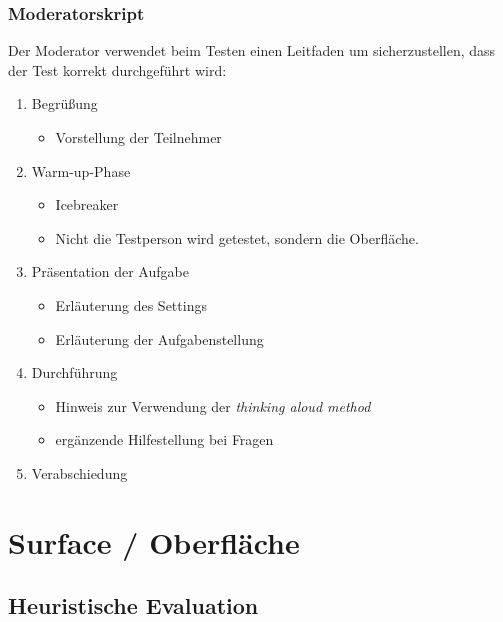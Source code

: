 \documentclass{article}
\begin{document}
\subsubsection{Moderatorskript}

Der Moderator verwendet beim Testen einen Leitfaden um sicherzustellen, dass der Test korrekt durchgeführt wird:
\begin{enumerate}
\item Begrüßung
	\begin{itemize}
	\item Vorstellung der Teilnehmer
	\end{itemize}
\item Warm-up-Phase
	\begin{itemize}
	\item Icebreaker
	\item Nicht die Testperson wird getestet, sondern die Oberfläche.
	\end{itemize}
\item Präsentation der Aufgabe
	\begin{itemize}
	\item Erläuterung des Settings
	\item Erläuterung der Aufgabenstellung
	\end{itemize}
\item Durchführung
	\begin{itemize}
	\item Hinweis zur Verwendung der \textit{thinking aloud method}
	\item ergänzende Hilfestellung bei Fragen
	\end{itemize}
\item Verabschiedung
\end{enumerate}

\newpage

\section{Surface / Oberfläche}

\subsection{Heuristische Evaluation}
\end{document}
